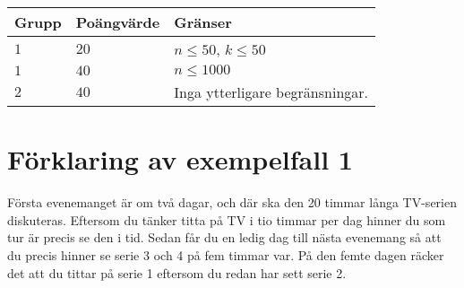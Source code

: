\noindent
\begin{tabular}{| l | l | l |}
\hline
Grupp & Poängvärde & Gränser \\ \hline
$1$   & $20$       & $n \leq 50$, $k \leq 50$ \\ \hline
$1$   & $40$       & $n \leq 1000$ \\ \hline
$2$   & $40$       & Inga ytterligare begränsningar. \\ \hline
\end{tabular}

\section*{Förklaring av exempelfall 1}
Första evenemanget är om två dagar, och där ska den 20 timmar långa TV-serien diskuteras. Eftersom du tänker titta på TV i tio timmar per dag hinner du som tur är precis se den i tid. Sedan får du en ledig dag till nästa evenemang så att du precis hinner se serie 3 och 4 på fem timmar var. På den femte dagen räcker det att du tittar på serie 1 eftersom du redan har sett serie 2.
